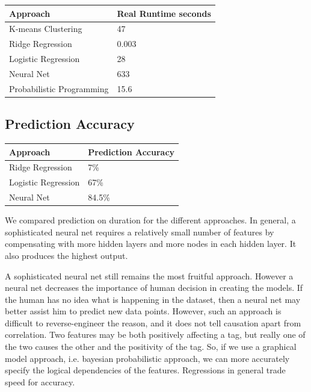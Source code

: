 \documentclass[]{article}
\begin{document}
\begin{center}
    \begin{tabular}{| l | l |}
    \hline
     Approach& Real Runtime seconds\\ 
    \hline%
    K-means Clustering & 47\\ 
    Ridge Regression & 0.003\\ 
    Logistic Regression& 28\\
    Neural Net & 633\\
    Probabilistic Programming& 15.6\\
    \hline
    \end{tabular}
\end{center}

\subsection{Prediction Accuracy}

\begin{center}
    \begin{tabular}{| l | l |}
    \hline
     Approach& Prediction Accuracy\\ 
    \hline%
    Ridge Regression & 7\%\\ 
    Logistic Regression& 67\%\\
    Neural Net & 84.5\%\\
    \hline
    \end{tabular}
\end{center}

We compared prediction on duration for the different approaches. 
 In general, a sophisticated neural net requires a relatively small number of features by compensating with more hidden layers and more nodes in each hidden layer. It also produces the highest output. 

A sophisticated neural net still remains the most fruitful approach. However a neural net decreases the importance of human decision in creating the models. If the human has no idea what is happening in the dataset, then a neural net may better assist him to predict new data points. However, such an approach is difficult to reverse-engineer the reason, and it does not tell causation apart from correlation. Two features may be both positively affecting a tag, but really one of the two causes the other and the positivity of the tag. So, if we use a graphical model approach, i.e. bayesian probabilistic approach, we can more accurately specify the logical dependencies of the features. Regressions in general trade speed for accuracy. 
\end{document}
